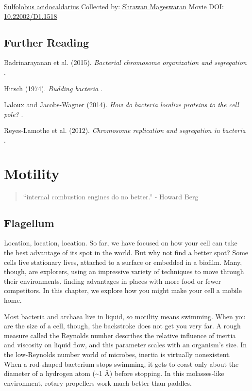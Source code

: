 \documentclass[]{tufte-book}
\begin{document}
\hypertarget{htmlwidget-09433e7533457fac8d66}{}

\label{fig:5-12}\protect\hyperlink{tree}{Sulfolobus acidocaldarius} Collected by: \protect\hyperlink{shrawan_mageswaran}{Shrawan Mageswaran} Movie DOI: \href{https://doi.org/10.22002/D1.1518}{10.22002/D1.1518}

\hypertarget{further-reading-4}{%
\section{Further Reading}\label{further-reading-4}}

Badrinarayanan et al. (2015). \emph{Bacterial chromosome organization and segregation} \citep{badrinarayanan2015}.

Hirsch (1974). \emph{Budding bacteria} \citep{hirsch1974}.

Laloux and Jacobs-Wagner (2014). \emph{How do bacteria localize proteins to the cell pole?} \citep{laloux2014}.

Reyes-Lamothe et al. (2012). \emph{Chromosome replication and segregation in bacteria} \citep{reyes-lamothe2012}.

\hypertarget{motility}{%
\chapter{Motility}\label{motility}}

\begin{quote}
``internal combustion engines do no better.''
- Howard Berg \citep{berg1988}
\end{quote}

\hypertarget{flagellum}{%
\section{Flagellum}\label{flagellum}}

Location, location, location. So far, we have focused on how your cell can take the best advantage of its spot in the world. But why not find a better spot? Some cells live stationary lives, attached to a surface or embedded in a biofilm. Many, though, are explorers, using an impressive variety of techniques to move through their environments, finding advantages in places with more food or fewer competitors. In this chapter, we explore how you might make your cell a mobile home.

Most bacteria and archaea live in liquid, so motility means swimming. When you are the size of a cell, though, the backstroke does not get you very far. A rough measure called the Reynolds number describes the relative influence of inertia and viscosity on liquid flow, and this parameter scales with an organism's size. In the low-Reynolds number world of microbes, inertia is virtually nonexistent. When a rod-shaped bacterium stops swimming, it gets to coast only about the diameter of a hydrogen atom (\textasciitilde{}1 Å) before stopping. In this molasses-like environment, rotary propellers work much better than paddles.
\end{document}
